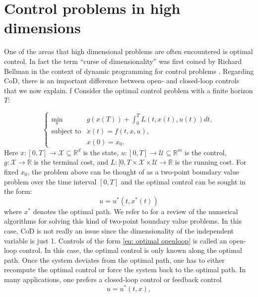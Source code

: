 \documentclass[12pt]{article}
\theoremstyle{definition}
\newcommand{\R}{\mathbb{R}}
\newcommand{\bx}{{x}}
\begin{document}
\section{Control problems in high dimensions}
\label{sec:control}

One of the areas that high dimensional problems are often encountered is optimal control. In fact the term ``curse of dimensionality''
was first coined by Richard Bellman in the context of dynamic programming for control problems \cite{Bellman1957}.
Regarding CoD, there is an important difference between open- and closed-loop controls that we now explain.
%
%
%
%
%
%
%
f%
%
Consider the optimal control problem with a finite horizon $T$:

\begin{equation}
\label{eq:OCP}
\left \{
\begin{array}{cl}
\underset{ u}{\text{min}} & g ( x (T)) + \displaystyle \int_0^{T} L (t,  x(t), u(t)) dt , \\
\text{subject to} & \dot { x} (t) = f (t,  x,  u) , \\
        &  x (0) =  x_0 .
\end{array}
\right .
\end{equation}
Here $ x : [0, T] \to \mathcal X \subseteq \R^d$ is the state, $ u : [0, T] \to \mathcal U \subseteq  \R^m$ is the control, 
%
$g: \mathcal X \to \R$ is the terminal cost, and $L: [0, T \times \mathcal X \times \mathcal U \to \R$ is the running cost.
For fixed $\bx_0$, the problem above can be thought of as a two-point boundary value problem over the time interval $[0, T]$ and
the optimal control can be sought in the form: 
\begin{equation}
\label{eq: optimal openloop}
 u = u^* (t,  x^*(t))
\end{equation}
where $\bx^*$ denotes the optimal path.  We refer to \cite{Rao2009survey} for a review of the numerical algorithms for solving
this kind of two-point boundary value problems. In this case, CoD is not really an issue since the dimensionality of the independent
variable is just 1.
Controls of the form \eqref{eq: optimal openloop} is called an open-loop control.  In this case, the optimal control is only known along the optimal path.
Once the system deviates from the optimal path, one has to either recompute the optimal control or force
the system back to the optimal path.  
In many applications, one prefers a closed-loop control or feedback control
\begin{equation}
\label{eq: optimal feedback}
u = u^* (t, x),
\end{equation}
\end{document}
